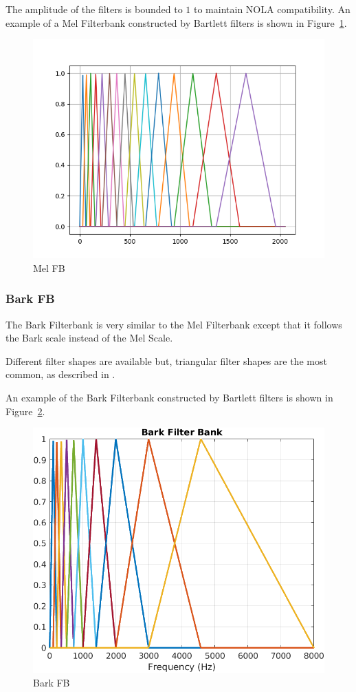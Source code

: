 The amplitude of the filters is bounded to \(1\) 
to maintain NOLA compatibility.
An example of a Mel Filterbank constructed by Bartlett filters
is shown in Figure~\ref{fig:sb_mel_fb}.
\begin{figure}[H]
    \centering
    \includegraphics[width=0.75\linewidth]{Features/images/sb_mel_fb}
    \caption{Mel FB}\label{fig:sb_mel_fb}
\end{figure}

\subsubsection{Bark FB}
The Bark Filterbank is very similar to the Mel Filterbank
except that it follows the Bark scale 
instead of the Mel Scale.

Different filter shapes are available but, 
triangular filter shapes are the most common,
as described in \cite{barkfilt}.

An example of the Bark Filterbank constructed by Bartlett filters
is shown in Figure~\ref{fig:mat_bark_fb}.
\begin{figure}[H]
    \centering
    \includegraphics[width=0.75\linewidth]{Features/images/mat_bark_fb}
    \caption{Bark FB}\label{fig:mat_bark_fb}
\end{figure}

